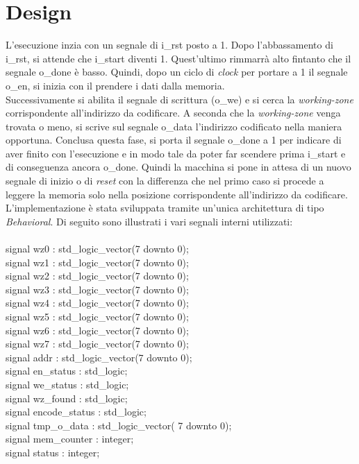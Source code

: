 \documentclass{article}
\begin{document}
\section{Design}
L'esecuzione inzia con un segnale di {\selectfont i\_rst} posto a 1. Dopo l'abbassamento di {\selectfont i\_rst}, si attende che {\selectfont i\_start} diventi 1. Quest'ultimo rimmarrà alto fintanto che il segnale {\selectfont o\_done} è basso. Quindi, dopo un ciclo di \textit{clock} per portare a 1 il segnale {\selectfont o\_en}, si inizia con il prendere i dati dalla memoria.\\Successivamente si abilita il segnale di scrittura ({\selectfont o\_we}) e si cerca la \textit{working-zone} corrispondente all'indirizzo da codificare. A seconda che la \textit{working-zone} venga trovata o meno, si scrive sul segnale {\selectfont o\_data} l'indirizzo codificato nella maniera opportuna. Conclusa questa fase, si porta il segnale {\selectfont o\_done} a 1 per indicare di aver finito con l'esecuzione e in modo tale da poter far scendere prima {\selectfont i\_start} e di conseguenza ancora {\selectfont o\_done}. Quindi la macchina si pone in attesa di un nuovo segnale di inizio o di \textit{reset} con la differenza che nel primo caso si procede a leggere la memoria solo nella posizione corrispondente all'indirizzo da codificare.\\
L'implementazione è stata sviluppata tramite un'unica architettura di tipo \textit{Behavioral}. Di seguito sono illustrati i vari segnali interni utilizzati:\\\\
{\selectfont
signal wz0 : std\_logic\_vector(7 downto 0);\\
signal wz1 : std\_logic\_vector(7 downto 0);\\
signal wz2 : std\_logic\_vector(7 downto 0);\\
signal wz3 : std\_logic\_vector(7 downto 0);\\
signal wz4 : std\_logic\_vector(7 downto 0);\\
signal wz5 : std\_logic\_vector(7 downto 0);\\
signal wz6 : std\_logic\_vector(7 downto 0);\\
signal wz7 : std\_logic\_vector(7 downto 0);\\
signal addr : std\_logic\_vector(7 downto 0);\\
signal en\_status : std\_logic;\\
signal we\_status : std\_logic;\\
signal wz\_found : std\_logic;\\
signal encode\_status : std\_logic;\\
signal tmp\_o\_data : std\_logic\_vector( 7 downto 0);\\
signal mem\_counter : integer;\\
signal status : integer;\\
}
\end{document}
